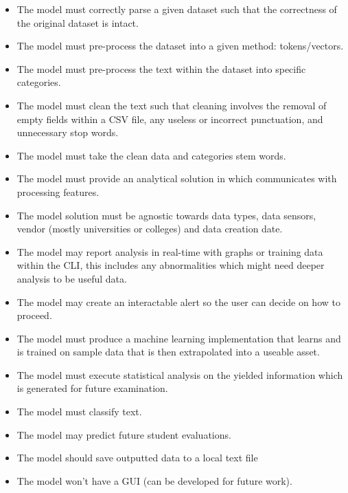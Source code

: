 \begin{itemize}
    \item The model must correctly parse a given dataset such that the correctness of the original dataset is intact.
    \item The model must pre-process the dataset into a given method: tokens/vectors.
    \item The model must pre-process the text within the dataset into specific categories.
    \item The model must clean the text such that cleaning involves the removal of empty fields within a CSV file, any useless or incorrect punctuation, and unnecessary stop words.
    \item The model must take the clean data and categories stem words.
    \item The model must provide an analytical solution in which communicates with processing features.
    \item The model solution must be agnostic towards data types, data sensors, vendor (mostly universities or colleges) and data creation date.
    \item The model may report analysis in real-time with graphs or training data within the CLI, this includes any abnormalities which might need deeper analysis to be useful data.
    \item The model may create an interactable alert so the user can decide on how to proceed.
    \item The model must produce a machine learning implementation that learns and is trained on sample data that is then extrapolated into a useable asset.
    \item The model must execute statistical analysis on the yielded information which is generated for future examination.
    \item The model must classify text.
    \item The model may predict future student evaluations.
    \item The model should save outputted data to a local text file
    \item The model won’t have a GUI (can be developed for future work).
\end{itemize}

